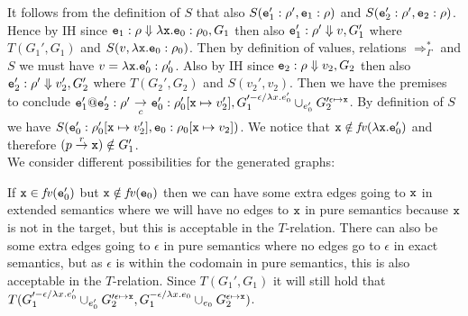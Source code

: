 \documentclass{LMCS}
\theoremstyle{definition}\newtheorem{env}[thm]{Environment}
\newcommand{\tosub}[1]{\raisebox{-6.0pt}{$\ \stackrel{\textstyle\to}{\vrule height4.5 pt width0 pt
    depth2.5 pt \smash{\scriptstyle#1}}\ $}}
\begin{document}
It follows from the definition of $S$ that also $S({\tt e}_1':\rho',{\tt e}_1:\rho)$ and $S({\tt e}_2':\rho',{\tt e}_2:\rho)$. Hence by IH since ${\tt e}_1:\rho\Downarrow \lambda {\tt x.e}_0:\rho_0,G_1$ then also ${\tt e}_1':\rho'\Downarrow v,G_1'$ where $T(G_1',G_1)$ and $S(v,\lambda {\tt x.e}_0:\rho_0)$. Then by definition of values, relations $\Rightarrow_\Gamma^*$ and $S$ we must have $v = \lambda {\tt x.e}_0':\rho_0'$. Also by IH since ${\tt e}_2:\rho\Downarrow v_2,G_2$ then also ${\tt e}_2':\rho'\Downarrow v_2',G_2'$ where $T(G_2',G_2)$ and $S(v_2',v_2)$. Then we have the premises to conclude ${\tt e}_1'{\tt @e}_2':\rho'\tosub{c} {\tt e}_0':\rho_0'[{\tt x}\mapsto v_2'], G_1'^{-\epsilon/\lambda x.e_0'}\cup_{e_0'} G_2'^{\epsilon\mapsto{\tt x}}$. By definition of $S$ we have $S({\tt e}_0':\rho_0'[{\tt x}\mapsto v_2'], {\tt e}_0:\rho_0[{\tt x}\mapsto v_2])$. 
We notice that ${\tt x}\notin \mathit{fv}(\lambda {\tt x.e}_0')$ and therefore $(p\stackrel{r}{\to}{\tt x})\notin G_1'$.\\
We consider different possibilities for the generated graphs:

If ${\tt x}\in \mathit{fv}({\tt e}_0')$ but ${\tt x}\notin \mathit{fv}({\tt e}_0)$ then we can have some extra edges going to ${\tt x}$ in extended semantics where we will have no edges to ${\tt x}$ in pure semantics because ${\tt x}$ is not in the target, but this is acceptable in the $T$-relation. There can also be some extra edges going to $\epsilon$ in pure semantics where no edges go to $\epsilon$ in exact semantics, but as $\epsilon$ is within the codomain in pure semantics, this is also acceptable in the $T$-relation. Since $T(G_1',G_1)$ it will still hold that $T(G_1'^{-\epsilon/\lambda x.e_0'}\cup_{e_0'} G_2'^{\epsilon\mapsto{\tt x}}, G_1^{-\epsilon/\lambda x.e_0}\cup_{e_0} G_2^{\epsilon\mapsto{\tt x}})$. 
\end{document}

